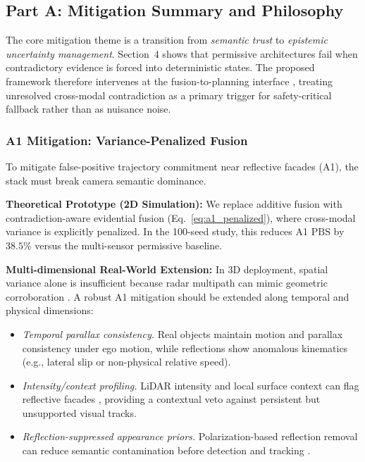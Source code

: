 \documentclass[sigconf,nonacm]{acmart}
\newcommand{\PBS}{\mathrm{PBS}}
\begin{document}
\subsection{Part A: Mitigation Summary and Philosophy}

The core mitigation theme is a transition from \textit{semantic trust} to \textit{epistemic uncertainty management}. Section~4 shows that permissive architectures fail when contradictory evidence is forced into deterministic states. The proposed framework therefore intervenes at the fusion-to-planning interface \cite{huang2022survey}, treating unresolved cross-modal contradiction as a primary trigger for safety-critical fallback rather than as nuisance noise.

\subsubsection{A1 Mitigation: Variance-Penalized Fusion}

To mitigate false-positive trajectory commitment near reflective facades (A1), the stack must break camera semantic dominance.

\textbf{Theoretical Prototype (2D Simulation):} We replace additive fusion with contradiction-aware evidential fusion (Eq.~\ref{eq:a1_penalized}), where cross-modal variance is explicitly penalized. In the 100-seed study, this reduces A1 $\PBS$ by $38.5\%$ versus the multi-sensor permissive baseline.

\textbf{Multi-dimensional Real-World Extension:} In 3D deployment, spatial variance alone is insufficient because radar multipath can mimic geometric corroboration \cite{zheng2024radar}. A robust A1 mitigation should be extended along temporal and physical dimensions:
\begin{itemize}
  \item \textit{Temporal parallax consistency.} Real objects maintain motion and parallax consistency under ego motion, while reflections show anomalous kinematics (e.g., lateral slip or non-physical relative speed).
  \item \textit{Intensity/context profiling.} LiDAR intensity and local surface context can flag reflective facades \cite{zhao2024ref}, providing a contextual veto against persistent but unsupported visual tracks.
  \item \textit{Reflection-suppressed appearance priors.} Polarization-based reflection removal can reduce semantic contamination before detection and tracking \cite{polarfree2025}.
\end{itemize}
\end{document}
